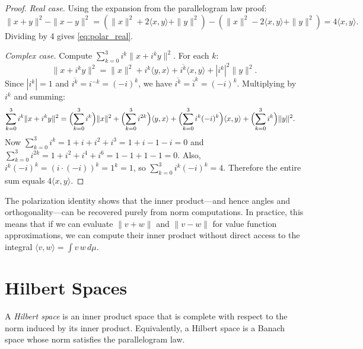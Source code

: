 \documentclass[11pt,a4paper]{article}
\begin{document}
\begin{proof}
\emph{Real case.} Using the expansion from the parallelogram law proof:
\[
\|x + y\|^2 - \|x - y\|^2
= (\|x\|^2 + 2\langle x, y \rangle + \|y\|^2)
- (\|x\|^2 - 2\langle x, y \rangle + \|y\|^2)
= 4\langle x, y \rangle.
\]
Dividing by 4 gives \eqref{eq:polar_real}.

\emph{Complex case.} Compute $\sum_{k=0}^3 i^k \|x + i^k y\|^2$. For each
$k$:
\[
\|x + i^k y\|^2 = \|x\|^2 + i^k \langle y, x \rangle
+ \overline{i^k} \langle x, y \rangle + |i^k|^2 \|y\|^2.
\]
Since $|i^k| = 1$ and $\overline{i^k} = i^{-k} = (-i)^k$, we have
$\overline{i^k} = \overline{i}^k = (-i)^k$. Multiplying by $i^k$ and
summing:
\begin{align*}
\sum_{k=0}^3 i^k \|x + i^k y\|^2
&= \Bigl(\sum_{k=0}^3 i^k\Bigr) \|x\|^2
 + \Bigl(\sum_{k=0}^3 i^{2k}\Bigr) \langle y, x \rangle
 + \Bigl(\sum_{k=0}^3 i^k (-i)^k\Bigr) \langle x, y \rangle
 + \Bigl(\sum_{k=0}^3 i^k\Bigr) \|y\|^2.
\end{align*}
Now $\sum_{k=0}^3 i^k = 1 + i + i^2 + i^3 = 1 + i - 1 - i = 0$ and
$\sum_{k=0}^3 i^{2k} = 1 + i^2 + i^4 + i^6 = 1 - 1 + 1 - 1 = 0$.
Also, $i^k(-i)^k = (i \cdot (-i))^k = 1^k = 1$, so
$\sum_{k=0}^3 i^k(-i)^k = 4$. Therefore the entire sum equals
$4\langle x, y \rangle$.
\end{proof}

\begin{rlconnection}[title={Polarization in Optimization}]
The polarization identity shows that the inner product---and hence angles and
orthogonality---can be recovered purely from norm computations. In practice,
this means that if we can evaluate $\|v + w\|$ and $\|v - w\|$ for value
function approximations, we can compute their inner product without direct
access to the integral $\langle v, w \rangle = \int v\, w\, d\mu$.
\end{rlconnection}


\section{Hilbert Spaces}
\label{sec:hilbert}

\begin{definition}
\label{def:hilbert_space}
A \emph{Hilbert space} is an inner product space that is complete with
respect to the norm induced by its inner product. Equivalently, a Hilbert
space is a Banach space whose norm satisfies the parallelogram law.
\end{definition}
\end{document}
